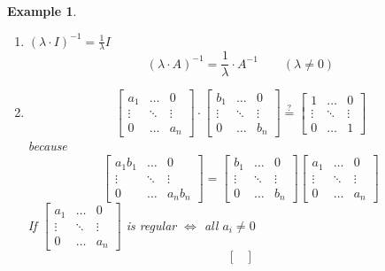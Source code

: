 \documentclass[a4paper,landscape,twocolumn]{article}
\newtheorem{ex}{Example}[section]
\begin{document}
\begin{ex}
  \begin{enumerate}
    \item $(\lambda \cdot I)^{-1} = \frac1\lambda I$
      \[ (\lambda \cdot A)^{-1} = \frac1\lambda \cdot A^{-1} \qquad (\lambda \neq 0) \]
    \item
      \[
        \begin{bmatrix}
          a_1 & \ldots & 0 \\
          \vdots & \ddots & \vdots \\
          0 & \ldots & a_n
        \end{bmatrix} \cdot
        \begin{bmatrix}
          b_1 & \ldots & 0 \\
          \vdots & \ddots & \vdots \\
          0 & \ldots & b_n
        \end{bmatrix}
        \overset{?}{=}
        \begin{bmatrix}
          1 & \ldots & 0 \\
          \vdots & \ddots & \vdots \\
          0 & \ldots & 1
        \end{bmatrix}
      \] because \[
        \begin{bmatrix}
          a_1 b_1 & \ldots & 0 \\
          \vdots & \ddots & \vdots \\
          0 & \ldots & a_n b_n
        \end{bmatrix} =
        \begin{bmatrix}
          b_1 & \ldots & 0 \\
          \vdots & \ddots & \vdots \\
          0 & \ldots & b_n
        \end{bmatrix}
        \begin{bmatrix}
          a_1 & \ldots & 0 \\
          \vdots & \ddots & \vdots \\
          0 & \ldots & a_n
        \end{bmatrix}
      \]
      If $
      \begin{bmatrix}
        a_1 & \ldots & 0 \\
        \vdots & \ddots & \vdots \\
        0 & \ldots & a_n
      \end{bmatrix}
      $ is regular $\iff$ all $a_i \neq 0$
      \[
        \begin{bmatrix}

\end{bmatrix}\]
\end{enumerate}
\end{ex}
\end{document}
